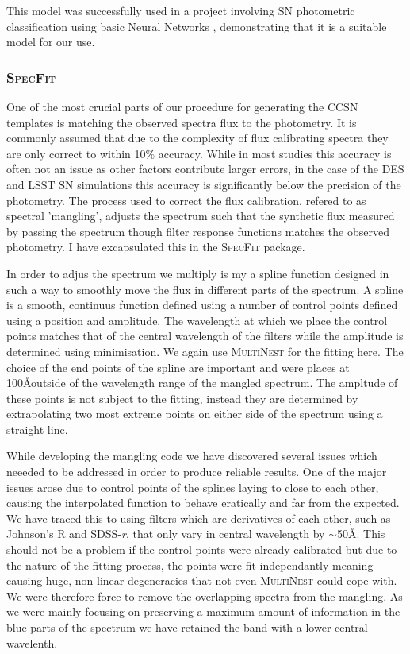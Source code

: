 This model was successfully used in a project involving SN photometric classification using basic Neural Networks \citep{Karpenka2012}, demonstrating that it is a suitable model for our use.

\subsubsection{\textsc{SpecFit}}
One of the most crucial parts of our procedure for generating the CCSN templates is matching the observed spectra flux to the photometry. It is commonly assumed that due to the complexity of flux calibrating spectra they are only correct to within 10\% accuracy. While in most studies this accuracy is often not an issue as other factors contribute larger errors, in the case of the DES and LSST SN simulations this accuracy is significantly below the precision of the photometry. The process used to correct the flux calibration, refered to as spectral 'mangling', adjusts the spectrum such that the synthetic flux measured by passing the spectrum though filter response functions matches the observed photometry. I have excapsulated this in the \textsc{SpecFit} package.

In order to adjus the spectrum we multiply is my a spline function designed in such a way to smoothly move the flux in different parts of the spectrum. A spline is a smooth, continuus function defined using a number of control points defined using a position and amplitude. The wavelength at which we place the control points matches that of the central wavelength of the filters while the amplitude is determined using minimisation. We again use \textsc{MultiNest} for the fitting here. The choice of the end points of the spline are important and were places at 100\AA outside of the wavelength range of the mangled spectrum. The ampltude of these points is not subject to the fitting, instead they are determined by extrapolating two most extreme points on either side of the spectrum using a straight line.

While developing the mangling code we have discovered several issues which neeeded to be addressed in order to produce reliable results. One of the major issues arose due to control points of the splines laying to close to each other, causing the interpolated function to behave eratically and far from the expected. We have traced this to using filters which are derivatives of each other, such as Johnson's R and SDSS-\textit{r}, that only vary in central wavelength by $\sim$50\AA. This should not be a problem if the control points were already calibrated but due to the nature of the fitting process, the points were fit independantly meaning causing huge, non-linear degeneracies that not even \textsc{MultiNest} could cope with. We were therefore force to remove the overlapping spectra from the mangling. As we were mainly focusing on preserving a maximum amount of information in the blue parts of the spectrum we have retained the band with a lower central wavelenth.

